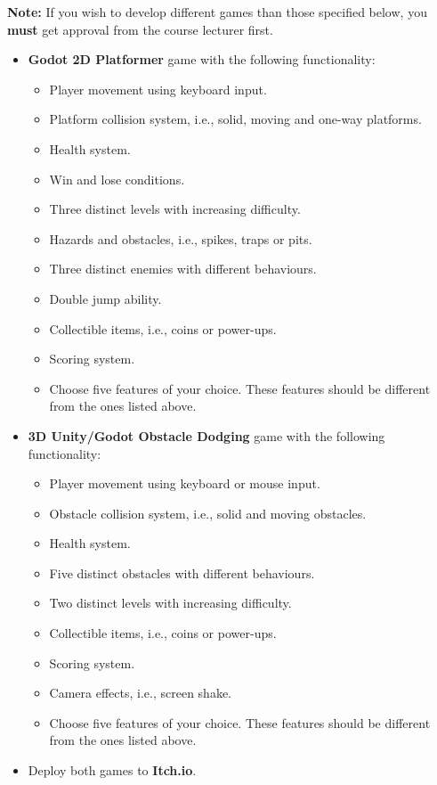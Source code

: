 \documentclass{article}
\begin{document}
	\textbf{Note:} If you wish to develop different games than those specified below, you \textbf{must} get approval from the course lecturer first.

	\begin{itemize}
		 \item  \textbf{Godot 2D Platformer} game with the following functionality:
		 \begin{itemize}
			\item Player movement using keyboard input.
			\item Platform collision system, i.e., solid, moving and one-way platforms.
			\item Health system.
			\item Win and lose conditions.
			\item Three distinct levels with increasing difficulty.
			\item Hazards and obstacles, i.e., spikes, traps or pits.
			\item Three distinct enemies with different behaviours.
			\item Double jump ability.
			\item Collectible items, i.e., coins or power-ups.
			\item Scoring system.
			\item Choose five features of your choice. These features should be different from the ones listed above.
		 \end{itemize}

		 \item \textbf{3D Unity/Godot Obstacle Dodging} game with the following functionality:
		 \begin{itemize}
			\item Player movement using keyboard or mouse input.
			\item Obstacle collision system, i.e., solid and moving obstacles.
			\item Health system.
			\item Five distinct obstacles with different behaviours.
			\item Two distinct levels with increasing difficulty.
			\item Collectible items, i.e., coins or power-ups.
			\item Scoring system.
			\item Camera effects, i.e., screen shake.
			\item Choose five features of your choice. These features should be different from the ones listed above.
		 \end{itemize}

		 \item Deploy both games to \textbf{Itch.io}.
	\end{itemize}
	
\end{document}

